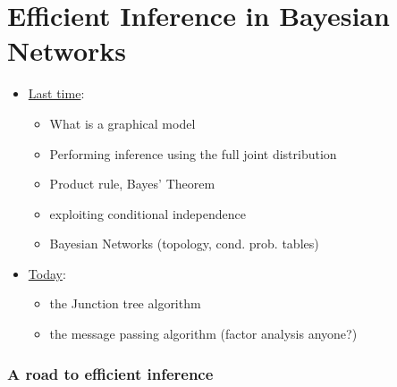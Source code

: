\section{Efficient Inference in Bayesian Networks}

\begin{frame} 

\end{frame}

\begin{frame}

\begin{itemize}
\item \underline{Last time}:
\begin{itemize}
\item What is a graphical model
\item Performing inference using the full joint distribution
\item Product rule, Bayes' Theorem
\item exploiting conditional independence
\item Bayesian Networks (topology, cond. prob. tables)
\end{itemize}

\pause

\item \underline{Today}:
\begin{itemize}
\item the Junction tree algorithm
\item the message passing algorithm (factor analysis anyone?)
\end{itemize}
\end{itemize}

\end{frame}

\subsubsection{A road to efficient inference}

